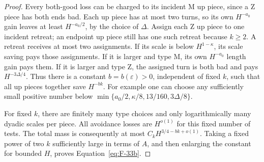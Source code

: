 \begin{proof}
Every both-good loss can be charged to its incident \(\mathrm M\)
up piece, since a \(\mathrm Z\) piece has both ends bad.  Each up
piece has at most two turns, so its own \(H^{-a_0}\) gain leaves
at least \(H^{-a_0/2}\), by the choice of \(\Delta\).  Assign
each \(\mathrm Z\) up piece to one incident retreat; an endpoint
up piece still has one such retreat because \(k\ge2\).  A retreat
receives at most two assignments.  If its scale is below
\(H^{1-\kappa}\), its scale saving pays those assignments.  If
it is larger and type \(\mathrm M\), its own \(H^{-a_0}\) length
gain pays them.  If it is larger and type \(\mathrm Z\), the
assigned turn is both bad and pays \(H^{-3\Delta/4}\).  Thus there
is a constant \(b=b(\varepsilon)>0\), independent of fixed \(k\),
such that all up pieces together save \(H^{-bk}\).  For example
one can choose any sufficiently small positive number below
\(\min\{a_0/2,\kappa/8,13/160,3\Delta/8\}\).

For fixed \(k\), there are finitely many type choices and only
logarithmically many dyadic scales per piece.  All avoidance losses
are \(H^{o(1)}\) for this fixed number of tests.  The total mass
is consequently at most \(C_kH^{3/4-bk+o(1)}\).  Taking a fixed
power of two \(k\) sufficiently large in terms of \(A\), and
then enlarging the constant for bounded \(H\), proves
Equation~\eqref{eq:F-33b}.
\end{proof}

